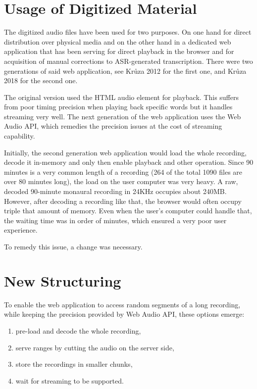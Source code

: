 \documentclass[runningheads]{llncs}
\begin{document}
\section{Usage of Digitized Material}

The digitized audio files have been used for two purposes. On one hand for
direct distribution over physical media and on the other hand in a dedicated web
application that has been serving for direct playback in the browser and for
acquisition of manual corrections to ASR-generated\cite{ircing2001large} transcription. There were
two generations of said web application, see Krůza 2012\cite{kruuza2012making} for the first one,
and Krůza 2018\cite{biblio:KrKuSecondGenerationWeb2018} for the second one.

The original version used the HTML audio element for playback. This suffers from
poor timing precision when playing back specific words but it handles streaming
very well. The next generation of the web application uses the Web Audio API,
which remedies the precision issues at the cost of streaming capability.

Initially, the second generation web application would load the whole recording,
decode it in-memory and only then enable playback and other operation. Since 90
minutes is a very common length of a recording (264 of the total 1090 files are
over 80 minutes long), the load on the user computer was very heavy. A raw,
decoded 90-minute monaural recording in 24KHz occupies about 240MB. However,
after decoding a recording like that, the browser would often occupy triple that
amount of memory. Even when the user's computer could handle that, the waiting
time was in order of minutes, which ensured a very poor user experience.

To remedy this issue, a change was necessary.

\section{New Structuring}

To enable the web application to access random segments of a long recording, while keeping the precision provided by Web Audio API, these options emerge: 
\begin{enumerate}
    \item{pre-load and decode the whole recording,}
    \item{serve ranges by cutting the audio on the server side,}
    \item{store the recordings in smaller chunks,}
    \item{wait for streaming to be supported.}
\end{enumerate}
\end{document}
